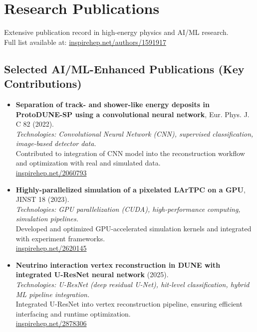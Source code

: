 \documentclass[a4paper,10pt]{article}
\begin{document}
\section{Research Publications}
Extensive publication record in high-energy physics and AI/ML research. \\
Full list available at: \href{https://inspirehep.net/authors/1591917}{inspirehep.net/authors/1591917}

\subsection*{Selected AI/ML-Enhanced Publications (Key Contributions)}
\begin{itemize}[leftmargin=0.5cm]
  \item \textbf{Separation of track- and shower-like energy deposits in ProtoDUNE-SP using a convolutional neural network}, Eur. Phys. J. C 82 (2022). \\
  \textit{Technologies: Convolutional Neural Network (CNN), supervised classification, image-based detector data.} \\
  Contributed to integration of CNN model into the reconstruction workflow and optimization with real and simulated data. \\
  \href{https://inspirehep.net/literature/2060793}{inspirehep.net/2060793}
  
  \item \textbf{Highly-parallelized simulation of a pixelated LArTPC on a GPU}, JINST 18 (2023). \\
  \textit{Technologies: GPU parallelization (CUDA), high-performance computing, simulation pipelines.} \\
  Developed and optimized GPU-accelerated simulation kernels and integrated with experiment frameworks. \\
  \href{https://inspirehep.net/literature/2620145}{inspirehep.net/2620145}
  
  \item \textbf{Neutrino interaction vertex reconstruction in DUNE with integrated U-ResNet neural network} (2025). \\
  \textit{Technologies: U-ResNet (deep residual U-Net), hit-level classification, hybrid ML pipeline integration.} \\
  Integrated U-ResNet into vertex reconstruction pipeline, ensuring efficient interfacing and runtime optimization. \\
  \href{https://inspirehep.net/literature/2878306}{inspirehep.net/2878306}
\end{itemize}
\end{document}
